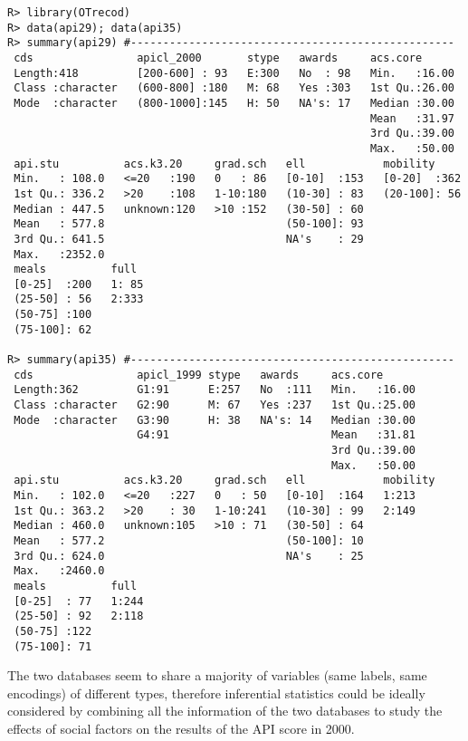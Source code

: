 \begin{verbatim}
R> library(OTrecod)
R> data(api29); data(api35)
R> summary(api29) #--------------------------------------------------
 cds                apicl_2000       stype   awards     acs.core    
 Length:418         [200-600] : 93   E:300   No  : 98   Min.   :16.00  
 Class :character   (600-800] :180   M: 68   Yes :303   1st Qu.:26.00  
 Mode  :character   (800-1000]:145   H: 50   NA's: 17   Median :30.00  
                                                        Mean   :31.97  
                                                        3rd Qu.:39.00  
                                                        Max.   :50.00  
 api.stu          acs.k3.20     grad.sch   ell            mobility  
 Min.   : 108.0   <=20   :190   0   : 86   [0-10]  :153   [0-20]  :362  
 1st Qu.: 336.2   >20    :108   1-10:180   (10-30] : 83   (20-100]: 56  
 Median : 447.5   unknown:120   >10 :152   (30-50] : 60                 
 Mean   : 577.8                            (50-100]: 93                 
 3rd Qu.: 641.5                            NA's    : 29                 
 Max.   :2352.0                                                         
 meals          full   
 [0-25]  :200   1: 85  
 (25-50] : 56   2:333  
 (50-75] :100          
 (75-100]: 62

R> summary(api35) #--------------------------------------------------
 cds                apicl_1999 stype   awards     acs.core    
 Length:362         G1:91      E:257   No  :111   Min.   :16.00  
 Class :character   G2:90      M: 67   Yes :237   1st Qu.:25.00  
 Mode  :character   G3:90      H: 38   NA's: 14   Median :30.00  
                    G4:91                         Mean   :31.81  
                                                  3rd Qu.:39.00  
                                                  Max.   :50.00  
 api.stu          acs.k3.20     grad.sch   ell            mobility
 Min.   : 102.0   <=20   :227   0   : 50   [0-10]  :164   1:213   
 1st Qu.: 363.2   >20    : 30   1-10:241   (10-30] : 99   2:149   
 Median : 460.0   unknown:105   >10 : 71   (30-50] : 64           
 Mean   : 577.2                            (50-100]: 10           
 3rd Qu.: 624.0                            NA's    : 25           
 Max.   :2460.0                                                   
 meals          full   
 [0-25]  : 77   1:244  
 (25-50] : 92   2:118  
 (50-75] :122          
 (75-100]: 71   
\end{verbatim}

The two databases seem to share a majority of variables (same labels, same encodings) of different types, therefore inferential statistics could be ideally considered by combining all the information of the two databases to study the effects of social factors on the results of the API score in 2000.


